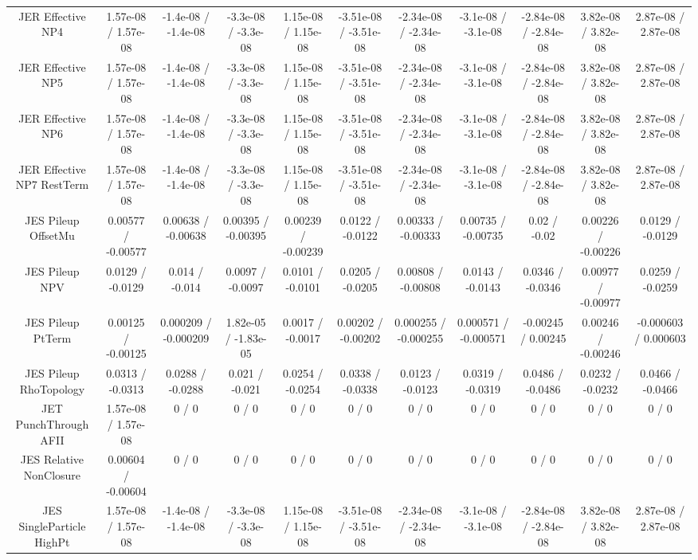\begin{table}[htbp]
\begin{center}
\begin{tabular}{|c|c|c|c|c|c|c|c|c|c|c|}
  JER Effective NP4 & 1.57e-08 / 1.57e-08 & -1.4e-08 / -1.4e-08 & -3.3e-08 / -3.3e-08 & 1.15e-08 / 1.15e-08 & -3.51e-08 / -3.51e-08 & -2.34e-08 / -2.34e-08 & -3.1e-08 / -3.1e-08 & -2.84e-08 / -2.84e-08 & 3.82e-08 / 3.82e-08 & 2.87e-08 / 2.87e-08 \\ 
  JER Effective NP5 & 1.57e-08 / 1.57e-08 & -1.4e-08 / -1.4e-08 & -3.3e-08 / -3.3e-08 & 1.15e-08 / 1.15e-08 & -3.51e-08 / -3.51e-08 & -2.34e-08 / -2.34e-08 & -3.1e-08 / -3.1e-08 & -2.84e-08 / -2.84e-08 & 3.82e-08 / 3.82e-08 & 2.87e-08 / 2.87e-08 \\ 
  JER Effective NP6 & 1.57e-08 / 1.57e-08 & -1.4e-08 / -1.4e-08 & -3.3e-08 / -3.3e-08 & 1.15e-08 / 1.15e-08 & -3.51e-08 / -3.51e-08 & -2.34e-08 / -2.34e-08 & -3.1e-08 / -3.1e-08 & -2.84e-08 / -2.84e-08 & 3.82e-08 / 3.82e-08 & 2.87e-08 / 2.87e-08 \\ 
  JER Effective NP7 RestTerm & 1.57e-08 / 1.57e-08 & -1.4e-08 / -1.4e-08 & -3.3e-08 / -3.3e-08 & 1.15e-08 / 1.15e-08 & -3.51e-08 / -3.51e-08 & -2.34e-08 / -2.34e-08 & -3.1e-08 / -3.1e-08 & -2.84e-08 / -2.84e-08 & 3.82e-08 / 3.82e-08 & 2.87e-08 / 2.87e-08 \\ 
  JES Pileup OffsetMu & 0.00577 / -0.00577 & 0.00638 / -0.00638 & 0.00395 / -0.00395 & 0.00239 / -0.00239 & 0.0122 / -0.0122 & 0.00333 / -0.00333 & 0.00735 / -0.00735 & 0.02 / -0.02 & 0.00226 / -0.00226 & 0.0129 / -0.0129 \\ 
  JES Pileup NPV & 0.0129 / -0.0129 & 0.014 / -0.014 & 0.0097 / -0.0097 & 0.0101 / -0.0101 & 0.0205 / -0.0205 & 0.00808 / -0.00808 & 0.0143 / -0.0143 & 0.0346 / -0.0346 & 0.00977 / -0.00977 & 0.0259 / -0.0259 \\ 
  JES Pileup PtTerm & 0.00125 / -0.00125 & 0.000209 / -0.000209 & 1.82e-05 / -1.83e-05 & 0.0017 / -0.0017 & 0.00202 / -0.00202 & 0.000255 / -0.000255 & 0.000571 / -0.000571 & -0.00245 / 0.00245 & 0.00246 / -0.00246 & -0.000603 / 0.000603 \\ 
  JES Pileup RhoTopology & 0.0313 / -0.0313 & 0.0288 / -0.0288 & 0.021 / -0.021 & 0.0254 / -0.0254 & 0.0338 / -0.0338 & 0.0123 / -0.0123 & 0.0319 / -0.0319 & 0.0486 / -0.0486 & 0.0232 / -0.0232 & 0.0466 / -0.0466 \\ 
  JET PunchThrough AFII & 1.57e-08 / 1.57e-08 & 0 / 0 & 0 / 0 & 0 / 0 & 0 / 0 & 0 / 0 & 0 / 0 & 0 / 0 & 0 / 0 & 0 / 0 \\ 
  JES Relative NonClosure & 0.00604 / -0.00604 & 0 / 0 & 0 / 0 & 0 / 0 & 0 / 0 & 0 / 0 & 0 / 0 & 0 / 0 & 0 / 0 & 0 / 0 \\ 
  JES SingleParticle HighPt & 1.57e-08 / 1.57e-08 & -1.4e-08 / -1.4e-08 & -3.3e-08 / -3.3e-08 & 1.15e-08 / 1.15e-08 & -3.51e-08 / -3.51e-08 & -2.34e-08 / -2.34e-08 & -3.1e-08 / -3.1e-08 & -2.84e-08 / -2.84e-08 & 3.82e-08 / 3.82e-08 & 2.87e-08 / 2.87e-08 \\ 

\end{tabular}
\end{center}
\end{table}
